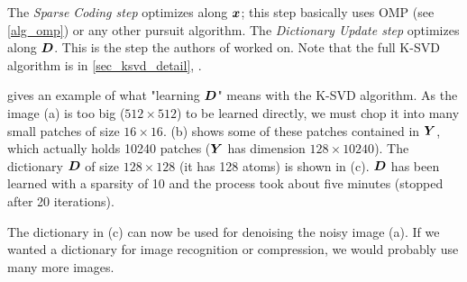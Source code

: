 The \emph{Sparse Coding step} optimizes along $\bm{x}$; this step basically uses OMP (see \cref{alg_omp}) or any other pursuit algorithm. The \emph{Dictionary Update step} optimizes along $\bm{D}$. This is the step the authors of \cite{chabiron_optimization_2016} worked on. Note that the full K-SVD algorithm is in \cref{sec_ksvd_detail}, .

 gives an example of what "learning $\bm{D}$" means with the K-SVD algorithm. As the image (a) is too big ($512 \times 512$) to be learned directly, we must chop it into many small patches of size $16 \times 16$. (b) shows some of these patches contained in $\bm{Y}$, which actually holds 10240 patches ($\bm{Y}$ has dimension $128 \times 10240$). The dictionary $\bm{D}$ of size $128 \times 128$ (it has 128 atoms) is shown in (c). $\bm{D}$ has been learned with a sparsity of 10 and the process took about five minutes (stopped after 20 iterations).

The dictionary in (c) can now be used for denoising the noisy image (a). If we wanted a dictionary for image recognition or compression, we would probably use many more images.

